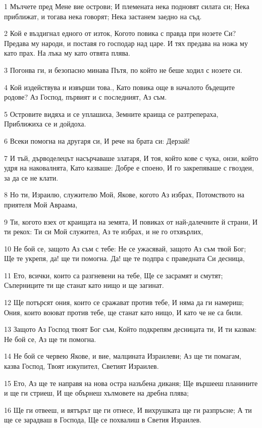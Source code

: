 \par 1 Мълчете пред Мене вие острови; И племената нека подновят силата си; Нека приближат, и тогава нека говорят; Нека застанем заедно на съд.
\par 2 Кой е въздигнал едного от изток, Когото повика с правда при нозете Си? Предава му народи, и поставя го господар над царе. И тях предава на ножа му като прах. На лъка му като отвята плява.
\par 3 Погонва ги, и безопасно минава Пътя, по който не беше ходил с нозете си.
\par 4 Кой издействува и извърши това., Като повика още в началото бъдещите родове? Аз Господ, първият и с последният, Аз съм.
\par 5 Островите видяха и се уплашиха, Земните краища се разтрепераха, Приближиха се и дойдоха.
\par 6 Всеки помогна на другаря си, И рече на брата си: Дерзай!
\par 7 И тъй, дърводелецът насърчаваше златаря, И тоя, който кове с чука, онзи, който удря на наковалнята, Като казваше: Добре е споено, И го закрепяваше с гвоздеи, за да се не клати.
\par 8 Но ти, Израилю, служителю Мой, Якове, когото Аз избрах, Потомството на приятеля Мой Авраама,
\par 9 Ти, когото взех от краищата на земята, И повиках от най-далечните й страни, И ти рекох: Ти си Мой служител, Аз те избрах, и не го отхвърлих,
\par 10 Не бой се, защото Аз съм с тебе: Не се ужасявай, защото Аз съм твой Бог; Ще те укрепя, да! ще ти помогна. Да! ще те подпра с праведната Си десница,
\par 11 Ето, всички, които са разгневени на тебе, Ще се засрамят и смутят; Съперниците ти ще станат като нищо и ще загинат.
\par 12 Ще потърсят ония, които се сражават против тебе, И няма да ги намериш; Ония, които воюват против тебе, ще станат като нищо, И като че не са били.
\par 13 Защото Аз Господ твоят Бог съм, Който подкрепям десницата ти, И ти казвам: Не бой се, Аз ще ти помогна.
\par 14 Не бой се червею Якове, и вие, малцината Израилеви; Аз ще ти помагам, казва Господ, Твоят изкупител, Светият Израилев.
\par 15 Ето, Аз ще те направя на нова остра назъбена диканя; Ще вършееш планините и ще ги стриеш, И ще обърнеш хълмовете на дребна плява;
\par 16 Ще ги отвееш, и вятърът ще ги отнесе, И вихрушката ще ги разпръсне; А ти ще се зарадваш в Господа, Ще се похвалиш в Светия Израилев.
